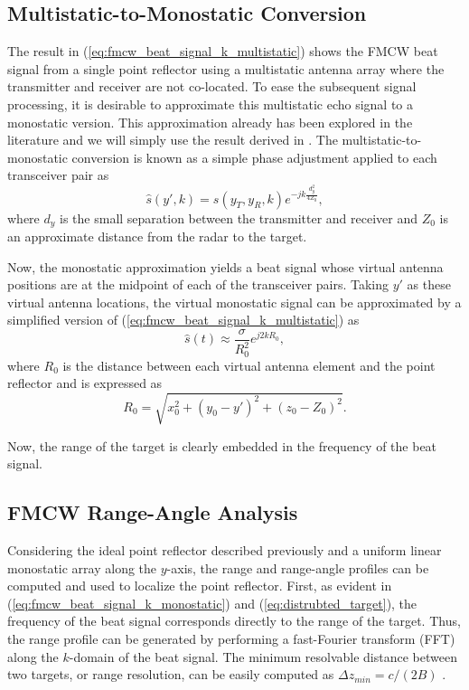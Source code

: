 \documentclass{ieeeaccess}
\begin{document}
\subsection{Multistatic-to-Monostatic Conversion}
\label{subsec:mult_to_mono}
The result in (\ref{eq:fmcw_beat_signal_k_multistatic}) shows the FMCW beat signal from a single point reflector using a multistatic antenna array where the transmitter and receiver are not co-located. To ease the subsequent signal processing, it is desirable to approximate this multistatic echo signal to a monostatic version. This approximation already has been explored in the literature and we will simply use the result derived in \cite{Yanik:NearFieldMIMOSAR,Yanik:CascadedMIMO}. The multistatic-to-monostatic conversion is known as a simple phase adjustment applied to each transceiver pair as
\begin{equation}
\label{eq:mult-to-mono}
    \hat{s}(y',k) = s(y_T,y_R,k) e^{-jk\frac{d_y^2}{4Z_0}},
\end{equation}
where $d_y$ is the small separation between the transmitter and receiver and $Z_0$ is an approximate distance from the radar to the target.

Now, the monostatic approximation yields a beat signal whose virtual antenna positions are at the midpoint of each of the transceiver pairs. Taking $y'$ as these virtual antenna locations, the virtual monostatic signal can be approximated by a simplified version of (\ref{eq:fmcw_beat_signal_k_multistatic}) as
\begin{equation}
\label{eq:fmcw_beat_signal_k_monostatic}
    \hat{s}(t) \approx \frac{\sigma}{R_0^2} e^{j2kR_0},
\end{equation}
where $R_0$ is the distance between each virtual antenna element and the point reflector and is expressed as
\begin{equation}
    R_0 = \sqrt{x_0^2 + (y_0-y')^2 + (z_0-Z_0)^2}.
\end{equation}

Now, the range of the target is clearly embedded in the frequency of the beat signal.

\subsection{FMCW Range-Angle Analysis}
\label{subsec:fmcw_range_angle_analysis}
Considering the ideal point reflector described previously and a uniform linear monostatic array along the $y$-axis, the range and range-angle profiles can be computed and used to localize the point reflector. First, as evident in (\ref{eq:fmcw_beat_signal_k_monostatic}) and (\ref{eq:distrubted_target}), the frequency of the beat signal corresponds directly to the range of the target. Thus, the range profile can be generated by performing a fast-Fourier transform (FFT) along the $k$-domain of the beat signal. The minimum resolvable distance between two targets, or range resolution, can be easily computed as $\Delta z_{min} = c/(2B)$ \cite{Sheen:NearField3DRadarImaging}. 
\end{document}
